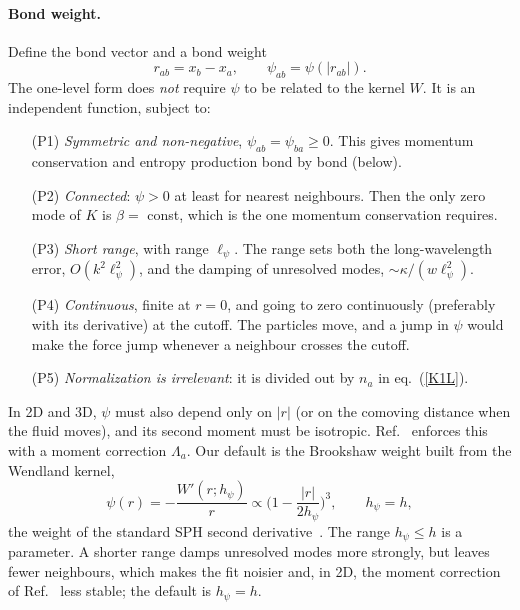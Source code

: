 \documentclass[11pt,aps,preprint,nofootinbib,superscriptaddress,tightenlines]{revtex4-2}
\def\st{\begin{equation}}
\def\stp{\end{equation}}
\def\Eq#1{eq.~(\ref{#1})}
\let\oldparagraph\paragraph
\renewcommand{\paragraph}{\par\bigskip\oldparagraph}
\begin{document}
\paragraph{Bond weight.}
Define the bond vector and a bond weight
\st
r_{ab}=x_b-x_a,\qquad \psi_{ab}=\psi(|r_{ab}|) .
\label{psi}
\stp
The one-level form does \emph{not} require $\psi$ to be related to the kernel
$W$.  It is an independent function, subject to:
\begin{enumerate}
\item[(P1)] \emph{Symmetric and non-negative}, $\psi_{ab}=\psi_{ba}\ge0$.  This
  gives momentum conservation and entropy production bond by bond (below).
\item[(P2)] \emph{Connected}: $\psi>0$ at least for nearest neighbours.  Then the
  only zero mode of $K$ is $\beta=$ const, which is the one momentum
  conservation requires.
\item[(P3)] \emph{Short range}, with range $\ell_\psi$.  The range sets both the
  long-wavelength error, $O(k^2\ell_\psi^2)$, and the damping of unresolved
  modes, $\sim\kappa/(w\ell_\psi^2)$.
\item[(P4)] \emph{Continuous}, finite at $r=0$, and going to zero continuously
  (preferably with its derivative) at the cutoff.  The particles move, and a
  jump in $\psi$ would make the force jump whenever a neighbour crosses the
  cutoff.
\item[(P5)] \emph{Normalization is irrelevant}: it is divided out by $n_a$ in
  \Eq{K1L}.
\end{enumerate}
In 2D and 3D, $\psi$ must also depend only on $|r|$ (or on the comoving distance
when the fluid moves), and its second moment must be isotropic.
Ref.~\cite{ParticleMetrics} enforces this with a moment correction $\Lambda_a$.
Our default is the Brookshaw weight built from the Wendland kernel,
\st
\psi(r)=-\frac{W'(r;h_\psi)}{r}\propto\Big(1-\frac{|r|}{2h_\psi}\Big)^3,
\qquad h_\psi=h,
\label{psidefault}
\stp
the weight of the standard SPH second derivative~\cite{Brookshaw1985}.  The
range $h_\psi\le h$ is a parameter.  A shorter range damps unresolved modes more
strongly, but leaves fewer neighbours, which makes the fit noisier and, in 2D,
the moment correction of Ref.~\cite{ParticleMetrics} less stable; the default
is $h_\psi=h$.
\end{document}
